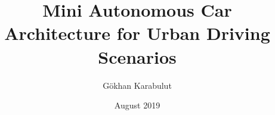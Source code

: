 \documentclass[chaparabic,ceng,ms,12pt,oneandhalf]{metu}
\author{Gökhan Karabulut}
\title{Mini Autonomous Car Architecture for Urban Driving Scenarios}
\date{August 2019}
\numberwithin{equation}{chapter}
\begin{document}
\begin{preliminaries}


\end{preliminaries}
%
%
%

\setlength{\parindent}{0em}
\setlength{\parskip}{10pt}












%
%

% 

% 
\end{document}
